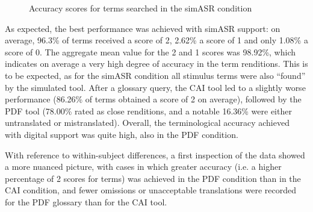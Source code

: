 \begin{figure}[p]
\caption[Accuracy scores of terms searched (simASR)]{Accuracy scores for terms searched in the simASR condition\label{fig:accuracy_ASR}}
\end{figure}


As expected, the best performance was achieved with simASR support: on average, 96.3\% of terms received a score of 2, 2.62\% a score of 1 and only 1.08\% a score of 0. The aggregate mean value for the 2 and 1 scores was 98.92\%, which indicates on average a very high degree of accuracy in the term renditions. This is to be expected, as for the simASR condition all stimulus terms were also ``found'' by the simulated tool. After a glossary query, the CAI tool led to a slightly worse performance (86.26\% of terms obtained a score of 2 on average), followed by the PDF tool (78.00\% rated as close renditions, and a notable 16.36\% were either untranslated or mistranslated). Overall, the terminological accuracy achieved with digital support was quite high, also in the PDF condition.

With reference to within-subject differences, a first inspection of the data showed a more nuanced picture, with cases in which greater accuracy (i.e. a higher percentage of 2 scores for terms) was achieved in the PDF condition than in the CAI condition, and fewer omissions or unacceptable translations were recorded for the PDF glossary than for the CAI tool.

